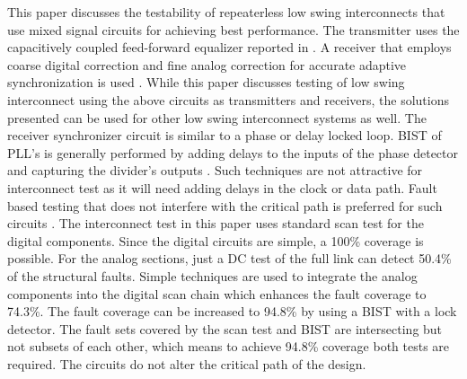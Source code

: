 \documentclass[conference]{IEEEtran}
\begin{document}
This paper discusses the testability of repeaterless low swing 
interconnects that use mixed signal circuits for achieving best performance.
The transmitter uses the capacitively coupled feed-forward equalizer reported in 
\cite{naveen_vlsi13}. A receiver that employs coarse digital correction
and fine analog correction for accurate adaptive synchronization is used
\cite{naveen-arxiv15}.
While this paper discusses testing of low swing interconnect using the above 
circuits as transmitters and receivers, the solutions presented can be used 
for other low swing interconnect systems as well.
The receiver synchronizer circuit
is similar to a phase or delay locked loop. BIST of PLL's is 
generally performed by
adding delays to the inputs of the phase detector and
capturing the divider's outputs \cite{bist-pll-tim05}. Such techniques
are not attractive for interconnect test as it will need
adding delays in the clock or data path. Fault based testing
that does not interfere with the critical path is preferred
for such circuits \cite{bist-pll-tcas2-01}. 
The interconnect test in this paper uses standard
scan test for the digital components. Since the
digital circuits are simple, a 100\% coverage is possible.
For the analog sections, just
a DC test of the full link can detect 50.4\% of the structural faults.
Simple techniques are used to integrate the analog components into
the digital scan chain which enhances the fault coverage to 74.3\%.
The fault coverage can be increased to 94.8\% by using a BIST with a
lock detector. The fault sets covered by the scan test and BIST are
intersecting but not subsets of each other, 
which means to achieve 94.8\% coverage both tests
are required. The circuits do not alter the critical path of the
design.
\end{document}
